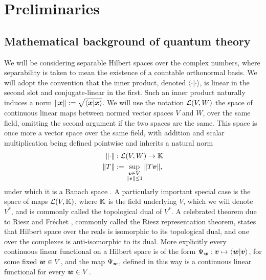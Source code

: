 \let\textcircled=\pgftextcircled
\chapter{Preliminaries}
\label{chap:prelim}


\bigskip

\section{Mathematical background of quantum theory}

We will be considering separable Hilbert spaces over the complex numbers, where separability is taken to mean the existence of a countable orthonormal basis. We will adopt the convention that the inner product, denoted $\langle\cdot|\cdot\rangle$, is linear in the second slot and conjugate-linear in the first. Such an inner product naturally induces a norm ${\left\lVert{\bm{x}}\right\rVert} := \sqrt{\langle \bm{x}| \bm{x}\rangle}$. We will use the notation $\bops[V][W]$ the space of continuous linear maps between normed vector spaces $V$ and $W$, over the same field, omitting the second argument if the two spaces are the same. This space is once more a vector space over the same field, with addition and scalar multiplication being defined pointwise and inherits a natural norm 
\begin{align}
  \norm{\cdot}&:\bops[V][W]\to \K\\
  \norm{T} &\defeq \sup_{\substack{\bov\in V \\ \norm{\bov}\leq 1}}\norm{T\bov}, \label{eqn:operator-norm}
\end{align}
under which it is a Banach space . A particularly important special case is the space of maps $\bops[V][\K]$, where $\mathbb{K}$ is the field underlying $V$, which we will denote $V^*$, and is commonly called the topological dual of $V^*$. A celebrated theorem due to Riesz \cite{riesz-representation-riesz} and Fr{\'e}chet \cite{riesz-representation-frechet}, commonly called the Riesz representation theorem, states that Hilbert space over the reals is isomorphic to its topological dual, and one over the complexes is anti-isomorphic to its dual. More explicitly every continuous linear functional on a Hilbert space is of the form $\Psi_{\bm{w}} :\bm{v}\mapsto \langle{\bm{w}} |\bm{v}\rangle$, for some fixed $\bm{w}\in V$, and the map $\Psi_{\bm{w}}$, defined in this way is a continuous linear functional for every $\bm{w}\in V$.

